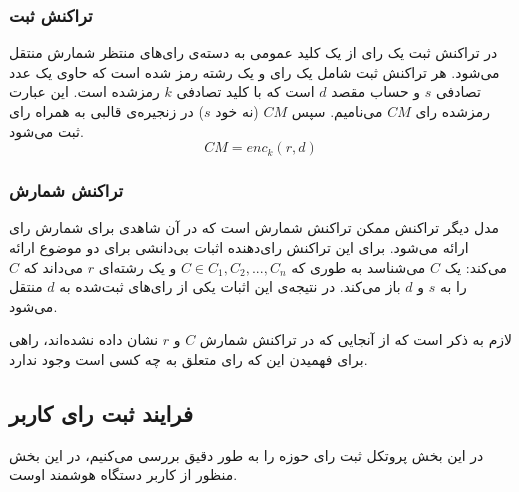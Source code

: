 \subsubsection{تراکنش ثبت}
در تراکنش ثبت یک رای از یک کلید عمومی به دسته‌ی رای‌های منتظر شمارش منتقل می‌شود. هر تراکنش ثبت شامل یک رای و یک رشته 
رمز شده است که حاوی یک عدد تصادفی $s$ و حساب مقصد $d$ است که با کلید تصادفی $k$ رمزشده است. این عبارت رمز‌شده رای $CM$ می‌نامیم. سپس $CM$ (نه خود $s$) در زنجیره‌ی قالبی به همراه رای ثبت می‌شود.
\\
\begin{equation}
CM = enc_{k} (r, d)
\label{eq:enc}
\end{equation}
\subsubsection{تراکنش شمارش}
مدل دیگر تراکنش ممکن تراکنش شمارش است که در آن شاهدی برای شمارش رای ارائه می‌شود. برای این تراکنش رای‌دهنده اثبات بی‌دانشی برای دو موضوع ارائه می‌کند: یک $C$ می‌شناسد به طوری که  $C \in C_1, C_2, ... ,C_n$ و یک رشته‌ای $r$ می‌داند که $C$ را به $s$ و $d$ باز می‌کند. در نتیجه‌ی این اثبات یکی از رای‌های ثبت‌شده به $d$ منتقل می‌شود.
\par
لازم به ذکر است که از آنجایی که در تراکنش شمارش $C$ و $r$ نشان داده نشده‌اند، راهی برای فهمیدن این که رای متعلق به چه کسی است وجود ندارد.

\subsection{فرایند ثبت رای کاربر}
در این بخش پروتکل ثبت رای حوزه را به طور دقیق بررسی می‌کنیم، در این بخش منظور از کاربر دستگاه هوشمند اوست. 


